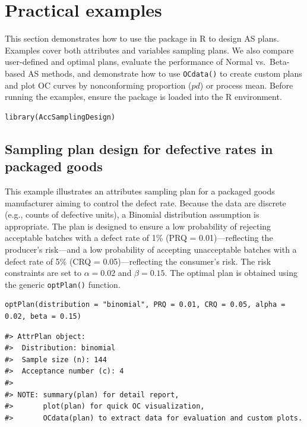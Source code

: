 \section{Practical examples}\label{sec:prac_examples}

This section demonstrates how to use the  package in
R to design AS plans. Examples cover both attributes and variables
sampling plans. We also compare user-defined and optimal plans, evaluate the
performance of Normal vs.~Beta-based AS methods, and demonstrate how to use
\texttt{OCdata()} to create custom plans and plot OC curves by nonconforming
proportion (\(pd\)) or process mean. Before running the examples, ensure the
package is loaded into the R environment.

\begin{verbatim}
library(AccSamplingDesign) 
\end{verbatim}

\subsection{Sampling plan design for defective rates in packaged goods}\label{subsec:packaged_goods_exp}

This example illustrates an attributes sampling plan for a packaged goods
manufacturer aiming to control the defect rate. Because the data are discrete
(e.g., counts of defective units), a Binomial distribution assumption is
appropriate. The plan is designed to ensure a low probability of rejecting
acceptable batches with a defect rate of 1\% (PRQ = 0.01)---reflecting the
producer's risk---and a low probability of accepting unacceptable batches with a
defect rate of 5\% (CRQ = 0.05)---reflecting the consumer's risk. The risk
constraints are set to \(\alpha = 0.02\) and \(\beta = 0.15\). The optimal plan
is obtained using the generic \texttt{optPlan()} function.

\begin{verbatim}
optPlan(distribution = "binomial", PRQ = 0.01, CRQ = 0.05, alpha = 0.02, beta = 0.15)
\end{verbatim}

\begin{verbatim}
#> AttrPlan object:
#>  Distribution: binomial 
#>  Sample size (n): 144 
#>  Acceptance number (c): 4 
#> 
#> NOTE: summary(plan) for detail report, 
#>       plot(plan) for quick OC visualization, 
#>       OCdata(plan) to extract data for evaluation and custom plots.
\end{verbatim}

